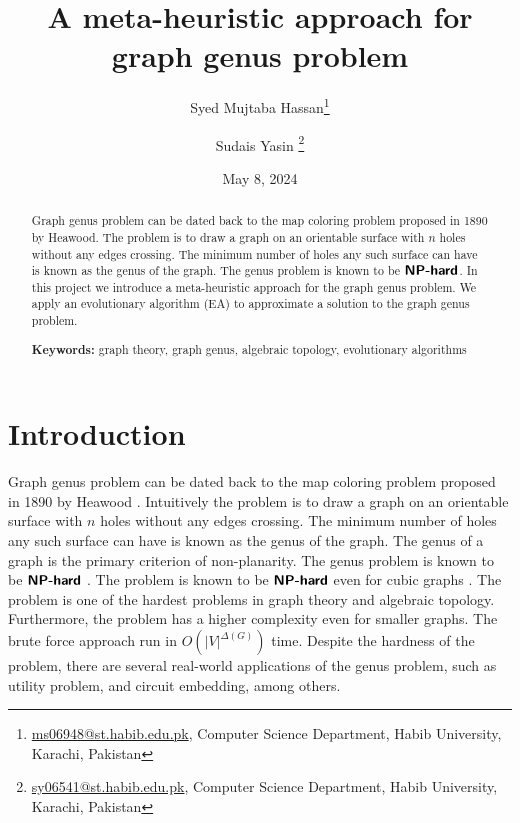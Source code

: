 \documentclass{article}
\newcommand{\classX}[1]{\ensuremath{\text{\textsf{\textbf{#1}}}}}
\newcommand{\NPH}{\classX{NP-hard}}
\begin{document}
\title{A meta-heuristic approach for graph genus problem}
\author{Syed Mujtaba Hassan\footnote{\url{ms06948@st.habib.edu.pk}, Computer Science Department, Habib University, Karachi, Pakistan} \and Sudais Yasin \footnote{\url{sy06541@st.habib.edu.pk}, Computer Science Department, Habib University, Karachi, Pakistan}}
\date{May 8, 2024}
\maketitle


\begin{abstract}
    Graph genus problem can be dated back to the map coloring problem proposed in 1890 by Heawood.
    The problem is to draw a graph on an orientable surface with $n$ holes without any edges crossing. 
    The minimum number of holes any such surface can have is known as the genus of the graph. 
    The genus problem is known to be $\NPH$. 
    In this project we introduce a meta-heuristic approach for the graph genus problem. We apply an evolutionary algorithm (EA) to approximate a solution to the graph genus problem. 
    
   
    \noindent\textbf{Keywords:} graph theory, graph genus, algebraic topology, evolutionary algorithms
\end{abstract}


\renewcommand\thefootnote{}


\renewcommand\thefootnote{\fnsymbol{footnote}}
\setcounter{footnote}{1}
\section{Introduction}\label{sec1}
    Graph genus problem can be dated back to the map coloring problem proposed in 1890 by Heawood \cite{Liangxia23}.
    Intuitively the problem is to draw a graph on an orientable surface with $n$ holes without any edges crossing. 
    The minimum number of holes any such surface can have is known as the genus of the graph. The genus of a graph is the primary criterion of non-planarity.
    The genus problem is known to be $\NPH$ \cite{Thomassen89}. The problem is known to be $\NPH$ even for cubic graphs \cite{Thomassen97}.
    The problem is one of the hardest problems in graph theory and algebraic topology. Furthermore, the problem has a higher complexity even for smaller graphs. The brute force approach run in $O(|V|^{\Delta(G)})$ time. 
    Despite the hardness of the problem, there are several real-world applications of the genus problem, such as utility problem, and circuit embedding, among others.
\end{document}
